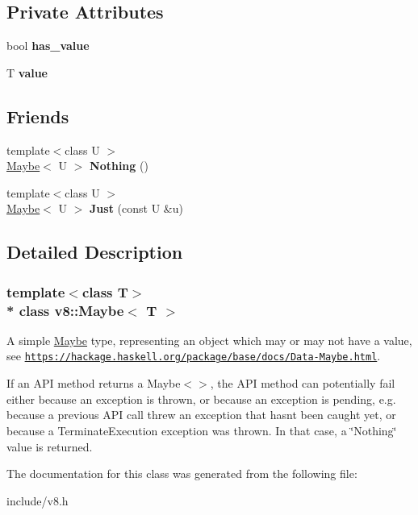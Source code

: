 \subsection*{Private Attributes}
\begin{DoxyCompactItemize}
\item 
bool {\bfseries has\+\_\+value}\hypertarget{classv8_1_1_maybe_afd7a3ebca6d97a4b87f2829a28723b0b}{}\label{classv8_1_1_maybe_afd7a3ebca6d97a4b87f2829a28723b0b}

\item 
T {\bfseries value}\hypertarget{classv8_1_1_maybe_ac3e067a7ae1b5cc92c2f570499db31ea}{}\label{classv8_1_1_maybe_ac3e067a7ae1b5cc92c2f570499db31ea}

\end{DoxyCompactItemize}
\subsection*{Friends}
\begin{DoxyCompactItemize}
\item 
{\footnotesize template$<$class U $>$ }\\\hyperlink{classv8_1_1_maybe}{Maybe}$<$ U $>$ {\bfseries Nothing} ()\hypertarget{classv8_1_1_maybe_aeb9593e125b42d748acbd69b72c89f37}{}\label{classv8_1_1_maybe_aeb9593e125b42d748acbd69b72c89f37}

\item 
{\footnotesize template$<$class U $>$ }\\\hyperlink{classv8_1_1_maybe}{Maybe}$<$ U $>$ {\bfseries Just} (const U \&u)\hypertarget{classv8_1_1_maybe_aeff0e7fedd63cfebe9a5286e2cd8552d}{}\label{classv8_1_1_maybe_aeff0e7fedd63cfebe9a5286e2cd8552d}

\end{DoxyCompactItemize}


\subsection{Detailed Description}
\subsubsection*{template$<$class T$>$\\*
class v8\+::\+Maybe$<$ T $>$}

A simple \hyperlink{classv8_1_1_maybe}{Maybe} type, representing an object which may or may not have a value, see \href{https://hackage.haskell.org/package/base/docs/Data-Maybe.html}{\tt https\+://hackage.\+haskell.\+org/package/base/docs/\+Data-\/\+Maybe.\+html}.

If an A\+PI method returns a Maybe$<$$>$, the A\+PI method can potentially fail either because an exception is thrown, or because an exception is pending, e.\+g. because a previous A\+PI call threw an exception that hasn\textquotesingle{}t been caught yet, or because a Terminate\+Execution exception was thrown. In that case, a \char`\"{}\+Nothing\char`\"{} value is returned. 

The documentation for this class was generated from the following file\+:\begin{DoxyCompactItemize}
\item 
include/v8.\+h\end{DoxyCompactItemize}
